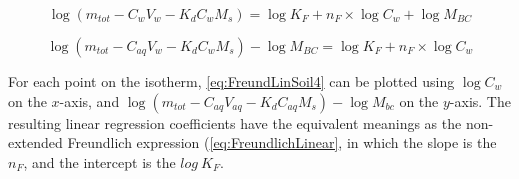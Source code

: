 \begin{equation} \label{eq:FreundLinSoil3}
    \log (m_{tot} - C_{w}V_{w} - K_dC_{w}M_s) = \log K_{F} + n_F \times \log C_{w} + \log M_{BC}
\end{equation}

\begin{equation} \label{eq:FreundLinSoil4}
    \log (m_{tot} - C_{aq}V_{w} - K_dC_{w}M_s) - \log M_{BC} = \log K_{F} + n_F \times \log C_{w}  
\end{equation}

For each point on the isotherm, \cref{eq:FreundLinSoil4} can be plotted using $\log C_{w}$ on the $x$-axis, and $\log (m_{tot} - C_{aq}V_{aq} - K_dC_{aq}M_s) - \log M_{bc}$ on the $y$-axis. The resulting linear regression coefficients have the equivalent meanings as the non-extended Freundlich expression (\cref{eq:FreundlichLinear}, in which the slope is the $n_F$, and the intercept is the $log~K_F$. 

